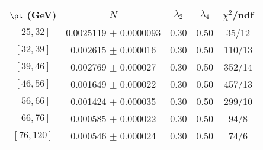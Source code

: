 \begin{tabular}{c||c|c|c|c}
$\pt$ (GeV) & $N$ & $\lambda_{2}$ & $\lambda_4$  & $\chi^2$/ndf  \\
\hline
$[25, 32]$ & 0.0025119 $\pm$ 0.0000093 & 0.30 & 0.50 & 35/12\\
$[32, 39]$ & 0.002615 $\pm$ 0.000016 & 0.30 & 0.50 & 110/13\\
$[39, 46]$ & 0.002769 $\pm$ 0.000027 & 0.30 & 0.50 & 352/14\\
$[46, 56]$ & 0.001649 $\pm$ 0.000022 & 0.30 & 0.50 & 457/13\\
$[56, 66]$ & 0.001424 $\pm$ 0.000035 & 0.30 & 0.50 & 299/10\\
$[66, 76]$ & 0.000585 $\pm$ 0.000022 & 0.30 & 0.50 & 94/8\\
$[76, 120]$ & 0.000546 $\pm$ 0.000024 & 0.30 & 0.50 & 74/6\\
\end{tabular}
